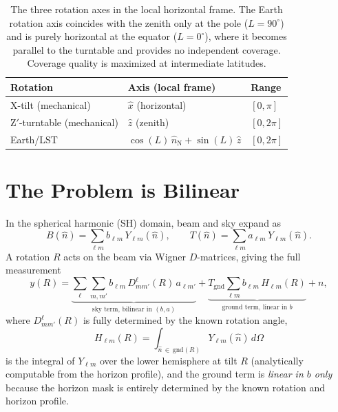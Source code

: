 \documentclass{aastex631}
\newcommand{\blm}{b_{\ell m}}
\newcommand{\alm}{a_{\ell m}}
\newcommand{\Hlm}{H_{\ell m}}
\newcommand{\Dlm}{D^\ell_{mm'}}
\newcommand{\Tgnd}{T_\mathrm{gnd}}
\theoremstyle{plain}
\theoremstyle{remark}
\begin{document}
\begin{table}
  \centering
  \begin{tabular}{lll}
    \toprule
    \textbf{Rotation} & \textbf{Axis (local frame)} & \textbf{Range} \\
    \midrule
    X-tilt (mechanical)
      & $\hat{x}$ (horizontal)
      & $[0, \pi]$ \\
    Z$'$-turntable (mechanical)
      & $\hat{z}$ (zenith)
      & $[0, 2\pi]$ \\
    Earth/LST
      & $\cos(L)\,\hat{n}_\mathrm{N} + \sin(L)\,\hat{z}$
      & $[0, 2\pi]$ \\
    \bottomrule
  \end{tabular}
  \caption{The three rotation axes in the local horizontal frame.
    The Earth rotation axis coincides with the zenith only at the pole
    ($L=90^\circ$) and is purely horizontal at the equator ($L=0^\circ$),
    where it becomes parallel to the turntable and provides no
    independent coverage.
    Coverage quality is maximized at intermediate latitudes.}
  \label{tab:axes}
\end{table}

\section{The Problem is Bilinear} \label{sec:bilinear}

In the spherical harmonic (SH) domain, beam and sky expand as
\begin{equation}
  B(\hat{n}) = \sum_{\ell m} \blm\, Y_{\ell m}(\hat{n}), \qquad
  T(\hat{n}) = \sum_{\ell m} \alm\, Y_{\ell m}(\hat{n}).
\end{equation}
A rotation $R$ acts on the beam via Wigner $D$-matrices, giving the
full measurement
\begin{equation} \label{eq:SH}
  y(R) = \underbrace{\sum_\ell \sum_{m,m'} \blm\, \Dlm(R)\, a_{\ell m'}}_{\text{sky term, bilinear in }(b,a)}
        + \underbrace{\Tgnd \sum_{\ell m} \blm\, \Hlm(R)}_{\text{ground term, linear in }b}
        + n,
\end{equation}
where $\Dlm(R)$ is fully determined by the known rotation angle,
\begin{equation}
  \Hlm(R) = \int_{\hat{n}\,\in\,\mathrm{gnd}(R)} Y_{\ell m}(\hat{n})\, d\Omega
\end{equation}
is the integral of $Y_{\ell m}$ over the lower hemisphere at tilt $R$
(analytically computable from the horizon profile), and the ground term
is \emph{linear in $b$ only} because the horizon mask is entirely
determined by the known rotation and horizon profile.
\end{document}
